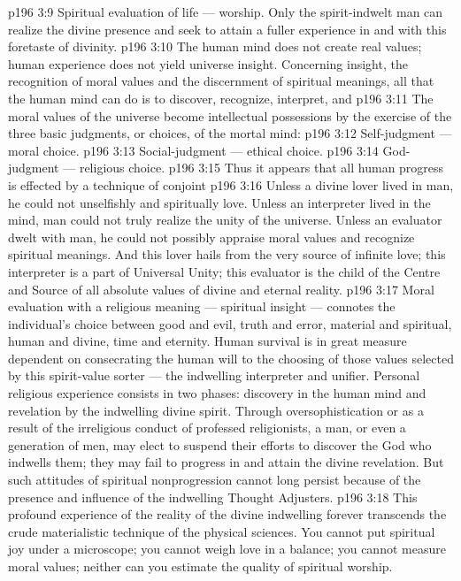 \vs p196 3:9 \bibnobreakspace Spiritual evaluation of life --- worship. Only the spirit\hyp{}indwelt man can realize the divine presence and seek to attain a fuller experience in and with this foretaste of divinity.
\vs p196 3:10 \pc The human mind does not create real values; human experience does not yield universe insight. Concerning insight, the recognition of moral values and the discernment of spiritual meanings, all that the human mind can do is to discover, recognize, interpret, and 
\vs p196 3:11 The moral values of the universe become intellectual possessions by the exercise of the three basic judgments, or choices, of the mortal mind:
\vs p196 3:12 \bibnobreakspace Self\hyp{}judgment --- moral choice.
\vs p196 3:13 \bibnobreakspace Social\hyp{}judgment --- ethical choice.
\vs p196 3:14 \bibnobreakspace God\hyp{}judgment --- religious choice.
\vs p196 3:15 \pc Thus it appears that all human progress is effected by a technique of conjoint 
\vs p196 3:16 Unless a divine lover lived in man, he could not unselfishly and spiritually love. Unless an interpreter lived in the mind, man could not truly realize the unity of the universe. Unless an evaluator dwelt with man, he could not possibly appraise moral values and recognize spiritual meanings. And this lover hails from the very source of infinite love; this interpreter is a part of Universal Unity; this evaluator is the child of the Centre and Source of all absolute values of divine and eternal reality.
\vs p196 3:17 Moral evaluation with a religious meaning --- spiritual insight --- connotes the individual’s choice between good and evil, truth and error, material and spiritual, human and divine, time and eternity. Human survival is in great measure dependent on consecrating the human will to the choosing of those values selected by this spirit\hyp{}value sorter --- the indwelling interpreter and unifier. Personal religious experience consists in two phases: discovery in the human mind and revelation by the indwelling divine spirit. Through oversophistication or as a result of the irreligious conduct of professed religionists, a man, or even a generation of men, may elect to suspend their efforts to discover the God who indwells them; they may fail to progress in and attain the divine revelation. But such attitudes of spiritual nonprogression cannot long persist because of the presence and influence of the indwelling Thought Adjusters.
\vs p196 3:18 This profound experience of the reality of the divine indwelling forever transcends the crude materialistic technique of the physical sciences. You cannot put spiritual joy under a microscope; you cannot weigh love in a balance; you cannot measure moral values; neither can you estimate the quality of spiritual worship.
